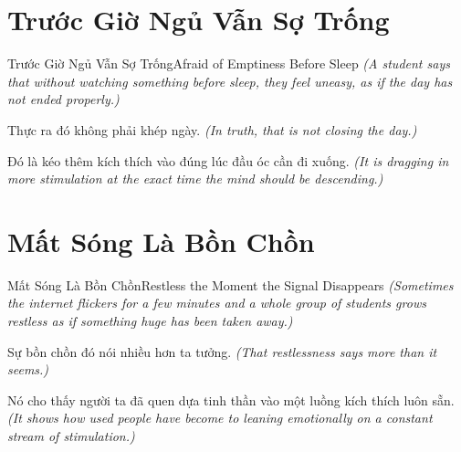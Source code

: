 \section{Trước Giờ Ngủ Vẫn Sợ Trống}
\begin{truyen}{Trước Giờ Ngủ Vẫn Sợ Trống}{Afraid of Emptiness Before Sleep}
\textit{(A student says that without watching something before sleep, they feel uneasy, as if the day has not ended properly.)}

Thực ra đó không phải khép ngày.
\textit{(In truth, that is not closing the day.)}

Đó là kéo thêm kích thích vào đúng lúc đầu óc cần đi xuống.
\textit{(It is dragging in more stimulation at the exact time the mind should be descending.)}

\end{truyen}

\section{Mất Sóng Là Bồn Chồn}
\begin{truyen}{Mất Sóng Là Bồn Chồn}{Restless the Moment the Signal Disappears}
\textit{(Sometimes the internet flickers for a few minutes and a whole group of students grows restless as if something huge has been taken away.)}

Sự bồn chồn đó nói nhiều hơn ta tưởng.
\textit{(That restlessness says more than it seems.)}

Nó cho thấy người ta đã quen dựa tinh thần vào một luồng kích thích luôn sẵn.
\textit{(It shows how used people have become to leaning emotionally on a constant stream of stimulation.)}

\end{truyen}

